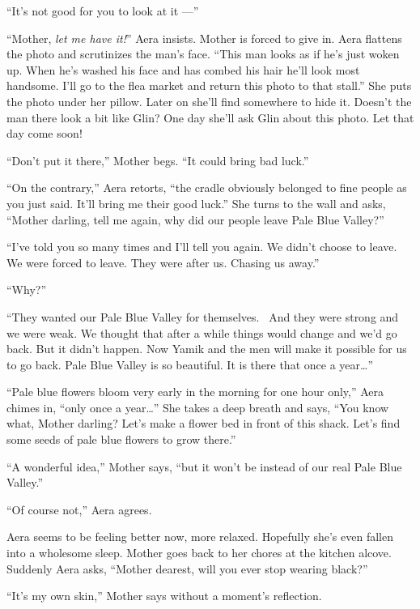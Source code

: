 \documentclass[twoside,11pt]{book}
\begin{document}
``It's not good for you to look at it ---''

``Mother, \textit{let me have it!}'' Aera insists. Mother is forced to give in. Aera flattens
the photo and scrutinizes the man's face. ``This man looks as if he's just woken up. When he's washed his
face and has combed his hair he'll look most handsome. I'll go to the flea market and return this photo to that
stall.'' She puts the photo under her pillow. Later on she'll find somewhere to hide it. Doesn't the man
there look a bit like Glin? One day she'll ask Glin about this photo.  Let that day come soon!

``Don't put it there,'' Mother begs. ``It could bring bad luck.''

``On the contrary,'' Aera retorts, ``the cradle obviously belonged to fine people
as you just said. It'll bring me their good luck.'' She turns to the wall and asks, ``Mother
darling, tell me again, why did our people leave Pale Blue Valley?''

``I've told you so many times and I'll tell you again. We didn't choose to leave. We were forced to
leave. They were after us. Chasing us away.''

``Why?''

``They wanted our Pale Blue Valley for themselves. ~And they were strong and we were weak. We thought that
after  a while things would change and we'd go back. But it didn't happen. Now Yamik and the men will make it
possible for us to go back. Pale Blue Valley is so beautiful. It is there that once a year{\ldots}''

 ``Pale blue flowers bloom very early in the morning for one hour only,'' Aera chimes in, ``only once a
year{\ldots}'' She takes a deep breath and says, ``You know what, Mother darling? Let's make
a flower bed in front of this shack. Let's find some seeds of pale blue flowers to grow there.''

``A wonderful idea,'' Mother says, ``but it won't be instead of our real Pale
Blue Valley.''

``Of course not,'' Aera agrees.

 Aera seems to be feeling better now, more relaxed. Hopefully she's even fallen into a wholesome sleep. Mother goes back
to her chores at the kitchen alcove. Suddenly Aera asks, ``Mother dearest, will you ever stop wearing
black?''

``It's my{ }own skin,'' Mother says without a moment's reflection.



\chapter{}
\end{document}
